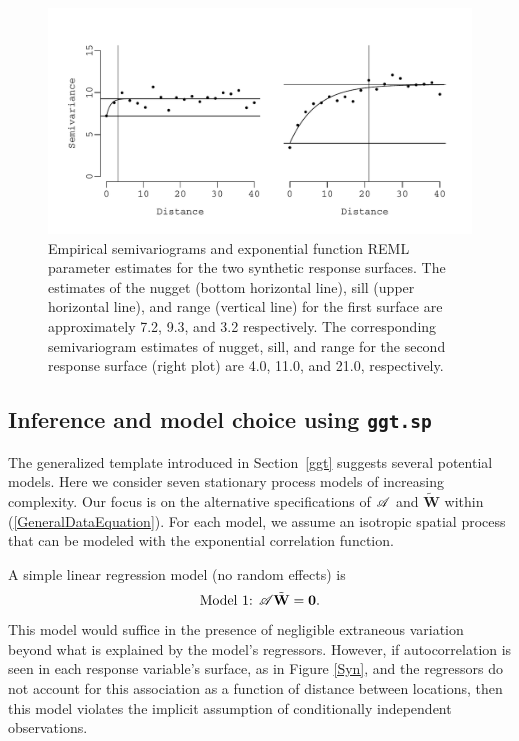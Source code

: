 \documentclass[a4paper]{article}
\newcommand{\bzero}{\textbf{0}}
\newcommand{\bW}{\textbf{W}}
\let\code=\texttt
\begin{document}
\begin{figure}[h!]
\centering
\includegraphics[width=14cm]{synVario.pdf}
\caption{Empirical semivariograms and exponential function REML parameter estimates for the two synthetic response surfaces.  The estimates of the nugget (bottom horizontal line), sill (upper horizontal line), and range (vertical line) for the first surface are approximately 7.2, 9.3, and 3.2 respectively.  The corresponding semivariogram estimates of nugget, sill, and range for the second response surface (right plot)  are 4.0, 11.0, and 21.0, respectively.}
\label{SynObsVario}
\end{figure}
\clearpage
\subsection[Inference and model choice using ggt.sp]{Inference and model choice using \code{ggt.sp}}\label{candidateModels}
The generalized template introduced in Section~\ref{ggt} suggests
several potential models.  Here we consider
seven stationary process models of increasing complexity.  Our focus
is on the alternative specifications of ${\cal A}$ and $\tilde{\bW}$
within (\ref{GeneralDataEquation}).  For each model, we assume an
isotropic spatial process that can be modeled with the exponential
correlation function.

A simple linear regression model (no random effects) is 
\[
\text{Model~1: } {\cal A}\tilde{\bW}=\bzero.
\]
This model would suffice in the presence of negligible
extraneous variation beyond what is explained by the model's
regressors. However, if autocorrelation is seen in each response variable's
surface, as in Figure \ref{Syn}, and the regressors do not
account for this association as a function of distance between
locations, then this model violates the implicit assumption of
conditionally independent observations.
\end{document}
